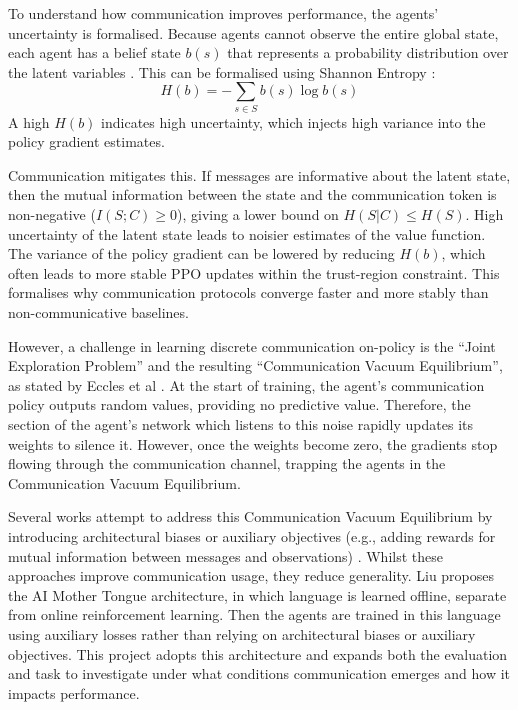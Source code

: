To understand how communication improves performance, the agents' uncertainty is formalised.
Because agents cannot observe the entire global state, each agent has a belief state $b(s)$ that represents a probability distribution over the latent variables \cite{belief}.
This can be formalised using Shannon Entropy \cite{shannon}:
\begin{equation}
H(b)=-\sum_{s \in S} b(s) \log b(s)
\end{equation}
A high $H(b)$ indicates high uncertainty, which injects high variance into the policy gradient estimates.

Communication mitigates this.
If messages are informative about the latent state, then the mutual information between the state and the communication token is non-negative ($I(S;C) \geq 0$), giving a lower bound on $H(S|C) \leq H(S)$.
High uncertainty of the latent state leads to noisier estimates of the value function.
The variance of the policy gradient can be lowered by reducing $H(b)$, which often leads to more stable PPO updates within the trust-region constraint.
This formalises why communication protocols converge faster and more stably than non-communicative baselines.

However, a challenge in learning discrete communication on-policy is the ``Joint Exploration Problem'' and the resulting ``Communication Vacuum Equilibrium'', as stated by Eccles et al \cite{Biases}.
At the start of training, the agent's communication policy outputs random values, providing no predictive value.
Therefore, the section of the agent's network which listens to this noise rapidly updates its weights to silence it.
However, once the weights become zero, the gradients stop flowing through the communication channel, trapping the agents in the Communication Vacuum Equilibrium.

Several works attempt to address this Communication Vacuum Equilibrium by introducing architectural biases or auxiliary objectives (e.g., adding rewards for mutual information between messages and observations) \cite{Biases, mi_comms}.
Whilst these approaches improve communication usage, they reduce generality.
Liu \cite{AIMotherTongue} proposes the AI Mother Tongue architecture, in which language is learned offline, separate from online reinforcement learning.
Then the agents are trained in this language using auxiliary losses rather than relying on architectural biases or auxiliary objectives.
This project adopts this architecture and expands both the evaluation and task to investigate under what conditions communication emerges and how it impacts performance.

